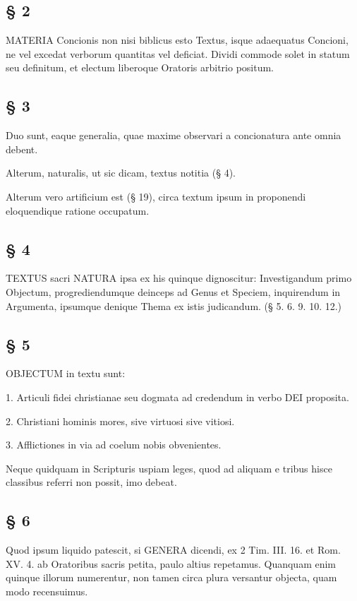 \subsection{§ 2}

MATERIA Concionis non nisi biblicus esto Textus, isque adaequatus Concioni, ne vel excedat verborum quantitas vel deficiat. Dividi commode solet in statum seu definitum, et electum liberoque Oratoris arbitrio positum.

\subsection{§ 3}

Duo sunt, eaque generalia, quae maxime observari a concionatura ante omnia debent.

Alterum, naturalis, ut sic dicam, textus notitia (§ 4).

Alterum vero artificium est (§ 19), circa textum ipsum in proponendi eloquendique ratione occupatum.

\subsection{§ 4}

TEXTUS sacri NATURA ipsa ex his quinque dignoscitur: Investigandum primo Objectum, progrediendumque deinceps ad Genus et Speciem, inquirendum in Argumenta, ipsumque denique Thema ex istis judicandum. (§ 5. 6. 9. 10. 12.)

\subsection{§ 5}

OBJECTUM in textu sunt:

1. Articuli fidei christianae seu dogmata ad credendum in verbo DEI proposita.

2. Christiani hominis mores, sive virtuosi sive vitiosi.

3. Afflictiones in via ad coelum nobis obvenientes.

Neque quidquam in Scripturis uspiam leges, quod ad aliquam e tribus hisce classibus referri non possit, imo debeat.

\subsection{§ 6}

Quod ipsum liquido patescit, si GENERA dicendi, ex 2 Tim. III. 16. et Rom. XV. 4. ab Oratoribus sacris petita, paulo altius repetamus. Quanquam enim quinque illorum numerentur, non tamen circa plura versantur objecta, quam modo recensuimus.

